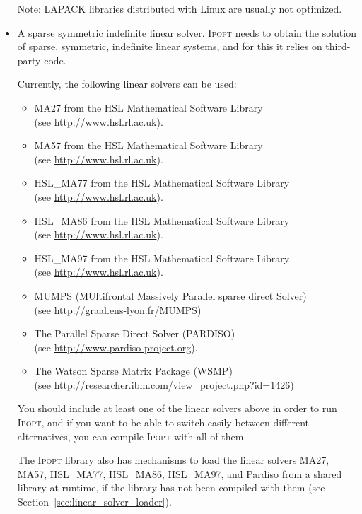 \documentclass[10pt]{article}
\newcommand{\Ipopt}{\textsc{Ipopt}\xspace}
\begin{document}
\begin{itemize}
  Note: LAPACK libraries distributed with Linux are usually not
  optimized.
\item A sparse symmetric indefinite linear solver. \Ipopt needs
  to obtain the solution of sparse, symmetric, indefinite linear
  systems, and for this it relies on third-party code.  

  Currently, the following linear solvers can be used:
  \begin{itemize}
  \item MA27 from the HSL Mathematical Software Library\\ (see \url{http://www.hsl.rl.ac.uk}).
  \item MA57 from the HSL Mathematical Software Library\\ (see \url{http://www.hsl.rl.ac.uk}).
  \item HSL\_MA77 from the HSL Mathematical Software Library\\ (see \url{http://www.hsl.rl.ac.uk}).
  \item HSL\_MA86 from the HSL Mathematical Software Library\\ (see \url{http://www.hsl.rl.ac.uk}).
  \item HSL\_MA97 from the HSL Mathematical Software Library\\ (see \url{http://www.hsl.rl.ac.uk}).
  \item MUMPS (MUltifrontal Massively Parallel sparse direct Solver)\\
    (see \url{http://graal.ens-lyon.fr/MUMPS})
  \item The Parallel Sparse Direct Solver (PARDISO)\\ (see \url{http://www.pardiso-project.org}).%
  \item The Watson Sparse Matrix Package (WSMP)\\ (see \url{http://researcher.ibm.com/view_project.php?id=1426})
  \end{itemize}
  You should include at least one of the linear solvers above in order
  to run \Ipopt, and if you want to be able to switch easily between
  different alternatives, you can compile \Ipopt with all of them.

  The \Ipopt library also has mechanisms to load the linear solvers MA27, 
  MA57, HSL\_MA77, HSL\_MA86, HSL\_MA97, and Pardiso from a shared library at 
  runtime, if the library has not been compiled with them (see
  Section~\ref{sec:linear_solver_loader}).


\end{itemize}
\end{document}
